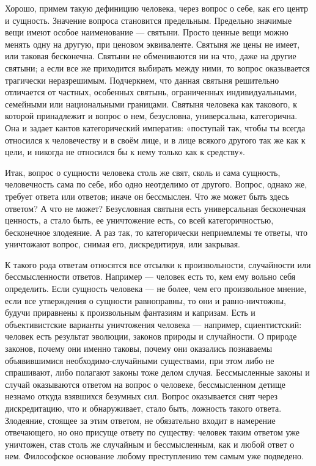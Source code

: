 \begin{multicols}{3}
Хорошо, примем такую дефиницию человека, через вопрос о себе, как его центр и
сущность. Значение вопроса становится предельным. Предельно значимые вещи имеют
особое наименование — святыни. Просто ценные вещи можно менять одну на другую,
при ценовом эквиваленте. Святыня же цены не имеет, или таковая бесконечна.
Святыни не обмениваются ни на что, даже на другие святыни; а если все же
приходится выбирать между ними, то вопрос оказывается трагически неразрешимым.
Подчеркнем, что данная святыня решительно отличается от частных, особенных
святынь, ограниченных индивидуальными, семейными или национальными границами.
Святыня человека как такового, к которой принадлежит и вопрос о нем,
безусловна, универсальна, категорична. Она и задает кантов категорический
императив: «поступай так, чтобы ты всегда относился к человечеству и в своём
лице, и в лице всякого другого так же как к цели, и никогда не относился бы к
нему только как к средству».

Итак, вопрос о сущности человека столь же свят, сколь и сама сущность,
человечность сама по себе, ибо одно неотделимо от другого. Вопрос, однако же,
требует ответа или ответов; иначе он бессмыслен. Что же может быть здесь
ответом? А что не может? Безусловная святыня есть универсальная бесконечная
ценность, а стало быть, ее уничтожение есть, со всей категоричностью,
бесконечное злодеяние. А раз так, то категорически неприемлемы те ответы, что
уничтожают вопрос, снимая его, дискредитируя, или закрывая.

К такого рода ответам относятся все отсылки к произвольности, случайности или
бессмысленности ответов. Например — человек есть то, кем ему вольно себя
определить. Если сущность человека — не более, чем его произвольное мнение,
если все утверждения о сущности равноправны, то они и равно-ничтожны, будучи
приравнены к произвольным фантазиям и капризам. Есть и объективистские варианты
уничтожения человека — например, сциентистский: человек есть результат
эволюции, законов природы и случайности. О природе законов, почему они именно
таковы, почему они оказались познаваемы объявившимися необходимо-случайными
существами, при этом либо не спрашивают, либо полагают законы тоже делом
случая. Бессмысленные законы и случай оказываются ответом на вопрос о человеке,
бессмысленном детище незнамо откуда взявшихся безумных сил. Вопрос оказывается
снят через дискредитацию, что и обнаруживает, стало быть, ложность такого
ответа. Злодеяние, стоящее за этим ответом, не обязательно входит в намерение
отвечающего, но оно присуще ответу по существу: человек таким ответом уже
уничтожен, став столь же случайным и бессмысленным, как и любой ответ о нем.
Философское основание любому преступлению тем самым уже подведено.


\end{multicols}
